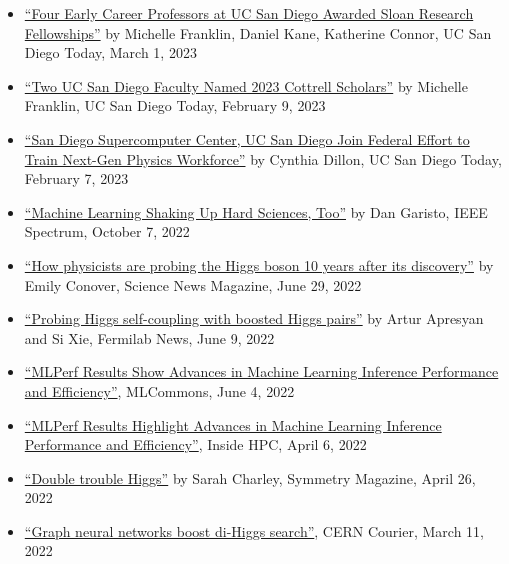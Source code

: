 \documentclass[11pt]{res}
\begin{document}
\begin{resume}
  \begin{itemize}
    \itemsep-0.3em
    \item \href{https://today.ucsd.edu/story/four-early-career-professors-at-uc-san-diego-awarded-sloan-research-fellowships}{``Four Early Career Professors at UC San Diego Awarded Sloan Research Fellowships''} by Michelle Franklin, Daniel Kane, Katherine Connor, UC San Diego Today, March 1, 2023
    \item \href{https://today.ucsd.edu/story/2023-cottrell-scholars}{``Two UC San Diego Faculty Named 2023 Cottrell Scholars''} by Michelle Franklin, UC San Diego Today, February 9, 2023
    \item \href{https://today.ucsd.edu/story/san-diego-supercomputer-center-uc-san-diego-join-federal-effort-to-train-next-gen-physics-workforce}{``San Diego Supercomputer Center, UC San Diego Join Federal Effort to Train Next-Gen Physics Workforce''} by Cynthia Dillon, UC San Diego Today, February 7, 2023
    \item \href{https://spectrum.ieee.org/machine-learning-in-physics}{``Machine Learning Shaking Up Hard Sciences, Too''} by Dan Garisto, IEEE Spectrum, October 7, 2022
    \item \href{https://www.sciencenews.org/article/higgs-boson-particle-physics-standard-model-discovery-anniversary}{``How physicists are probing the Higgs boson 10 years after its discovery''} by Emily Conover, Science News Magazine, June 29, 2022
    \item \href{https://news.fnal.gov/2022/06/probing-higgs-self-coupling-with-boosted-higgs-pairs/}{``Probing Higgs self-coupling with boosted Higgs pairs''} by Artur Apresyan and Si Xie, Fermilab News, June 9, 2022
    \item \href{https://mlcommons.org/en/news/mlperf-inference-1q2022/}{``MLPerf Results Show Advances in Machine Learning Inference Performance and Efficiency''}, MLCommons, June 4, 2022
    \item \href{https://insidehpc.com/2022/04/mlperf-results-highlight-advances-in-machine-learning-inference-performance-and-efficiency/}{``MLPerf Results Highlight Advances in Machine Learning Inference Performance and Efficiency''}, Inside HPC, April 6, 2022
    \item \href{https://www.symmetrymagazine.org/article/double-trouble-higgs}{``Double trouble Higgs''} by Sarah Charley, Symmetry Magazine, April 26, 2022
    \item \href{https://cerncourier.com/a/graph-neural-networks-boost-di-higgs-search/}{``Graph neural networks boost di-Higgs search''}, CERN Courier, March 11, 2022

\end{itemize}
\end{resume}
\end{document}
